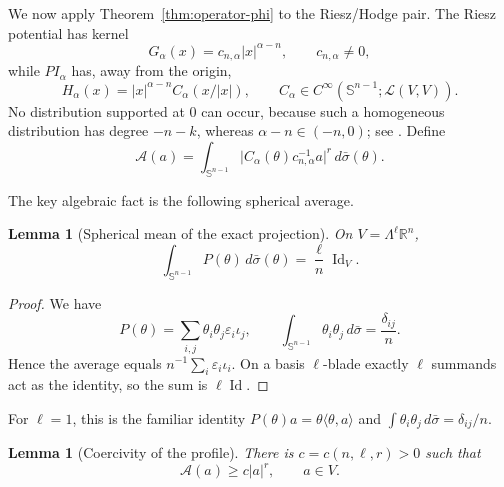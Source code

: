 \documentclass[11pt]{amsart}
\numberwithin{equation}{section}
\newtheorem{lemma}[theorem]{Lemma}
\theoremstyle{definition}
\theoremstyle{remark}
\newcommand{\R}{\mathbb R}
\newcommand{\Sph}{\mathbb S}
\newcommand{\cL}{\mathcal L}
\newcommand{\eps}{\varepsilon}
\newcommand{\ii}{\iota}
\newcommand{\Id}{\operatorname{Id}}
\begin{document}
We now apply Theorem~\ref{thm:operator-phi} to the Riesz/Hodge pair.
The Riesz potential has kernel
\begin{equation}\label{eq:riesz-kernel}
 G_\alpha(x)=c_{n,\alpha}|x|^{\alpha-n},\qquad c_{n,\alpha}\ne0,
\end{equation}
while $P I_\alpha$ has, away from the origin,
\begin{equation}\label{eq:projected-kernel}
 H_\alpha(x)=|x|^{\alpha-n}C_\alpha(x/|x|),
 \qquad C_\alpha\in C^\infty(\Sph^{n-1};\cL(V,V)).
\end{equation}
No distribution supported at $0$ can occur, because such a homogeneous
distribution has degree $-n-k$, whereas $\alpha-n\in(-n,0)$; see
\cite[Chapters~II and V]{Stein70}.  Define
\begin{equation}\label{eq:profile}
 \mathcal A(a)=\int_{\Sph^{n-1}}
 \bigl|C_\alpha(\theta)c_{n,\alpha}^{-1}a\bigr|^r\,d\bar\sigma(\theta).
\end{equation}

The key algebraic fact is the following spherical average.

\begin{lemma}[Spherical mean of the exact projection]\label{lem:average-P}
On $V=\Lambda^\ell\R^n$,
\begin{equation}\label{eq:average-P}
 \int_{\Sph^{n-1}}P(\theta)\,d\bar\sigma(\theta)
 =\frac\ell n\Id_V.
\end{equation}
\end{lemma}

\begin{proof}
We have
\[
 P(\theta)=\sum_{i,j}\theta_i\theta_j\eps_i\ii_j,
 \qquad
 \int_{\Sph^{n-1}}\theta_i\theta_j\,d\bar\sigma=\frac{\delta_{ij}}n.
\]
Hence the average equals $n^{-1}\sum_i\eps_i\ii_i$.  On a basis
$\ell$-blade exactly $\ell$ summands act as the identity, so the sum is
$\ell\Id$.
\end{proof}

For $\ell=1$, this is the familiar identity
$P(\theta)a=\theta\langle\theta,a\rangle$ and
$\int\theta_i\theta_j\,d\bar\sigma=\delta_{ij}/n$.

\begin{lemma}[Coercivity of the profile]\label{lem:profile-coercive}
There is $c=c(n,\ell,r)>0$ such that
\begin{equation}\label{eq:profile-coercive}
 \mathcal A(a)\ge c|a|^r,\qquad a\in V.
\end{equation}
\end{lemma}
\end{document}
